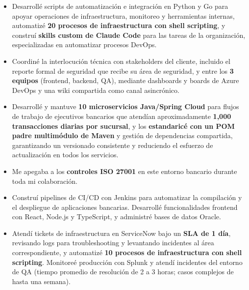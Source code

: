 {\begin{itemize}
    \item Desarrollé scripts de automatización e integración en Python y Go para apoyar operaciones de infraestructura, monitoreo y herramientas internas, automatizé \textbf{20 procesos de infraestructura con shell scripting}, y construí \textbf{skills custom de Claude Code} para las tareas de la organización, especializadas en automatizar procesos DevOps.
    \item Coordiné la interlocución técnica con stakeholders del cliente, incluido el reporte formal de seguridad que recibe su área de seguridad, y entre los \textbf{3 equipos} (frontend, backend, QA), mediante dashboards y boards de Azure DevOps y una wiki compartida como canal asincrónico.
\end{itemize}

\begin{itemize}
    \item Desarrollé y mantuve \textbf{10 microservicios Java/Spring Cloud} para flujos de trabajo de ejecutivos bancarios que atendían aproximadamente \textbf{1,000 transacciones diarias por sucursal}, y los \textbf{estandaricé con un POM padre multimódulo de Maven} y gestión de dependencias compartida, garantizando un versionado consistente y reduciendo el esfuerzo de actualización en todos los servicios.
    \item Me apegaba a los \textbf{controles ISO 27001} en este entorno bancario durante toda mi colaboración.
    \item Construí pipelines de CI/CD con Jenkins para automatizar la compilación y el despliegue de aplicaciones bancarias. Desarrollé funcionalidades frontend con React, Node.js y TypeScript, y administré bases de datos Oracle.
    \item Atendí tickets de infraestructura en ServiceNow bajo un \textbf{SLA de 1 día}, revisando logs para troubleshooting y levantando incidentes al área correspondiente, y automatizé \textbf{10 procesos de infraestructura con shell scripting}. Monitoreé producción con Splunk y atendí incidentes del entorno de QA (tiempo promedio de resolución de 2 a 3 horas; casos complejos de hasta una semana).
\end{itemize}

}

